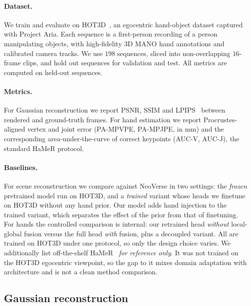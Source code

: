 \documentclass[10pt,twocolumn,letterpaper]{article}
\begin{document}
\paragraph{Dataset.}
We train and evaluate on HOT3D~\cite{banerjee2024hot3d}, an egocentric
hand-object dataset captured with Project Aria. Each sequence is a first-person
recording of a person manipulating objects, with high-fidelity 3D MANO hand
annotations and calibrated camera tracks. We use $198$ sequences, sliced into
non-overlapping $16$-frame clips, and hold out sequences for validation and
test. All metrics are computed on held-out sequences.

\paragraph{Metrics.}
For Gaussian reconstruction we report PSNR, SSIM and
LPIPS~\cite{zhang2018lpips} between rendered and ground-truth frames. For hand
estimation we report Procrustes-aligned vertex and joint error (PA-MPVPE,
PA-MPJPE, in mm) and the corresponding area-under-the-curve of correct keypoints
(AUC-V, AUC-J), the standard HaMeR protocol.

\paragraph{Baselines.}
For scene reconstruction we compare against NeoVerse in two settings: the
\emph{frozen} pretrained model run on HOT3D, and a \emph{trained} variant whose
heads we finetune on HOT3D without any hand prior. Our model adds hand injection
to the trained variant, which separates the effect of the prior from that of
finetuning. For hands the controlled comparison is internal: our
retrained head \emph{without} local-global fusion versus the full head
\emph{with} fusion, plus a decoupled variant. All are trained on HOT3D under one
protocol, so only the design choice varies. We additionally list
off-the-shelf HaMeR~\cite{pavlakos2024hamer} \emph{for reference only}. It was not
trained on the HOT3D egocentric viewpoint, so the gap to it mixes domain
adaptation with architecture and is not a clean method comparison.

\subsection{Gaussian reconstruction}
\label{sec:gs}
\end{document}
